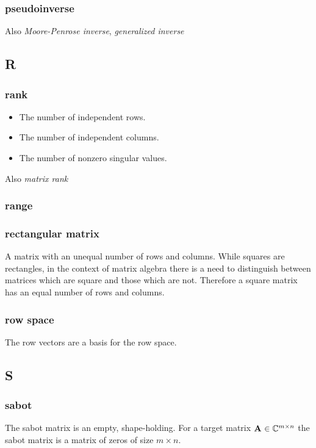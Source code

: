 \subsubsection*{pseudoinverse}
Also {\it Moore-Penrose inverse}, {\it generalized inverse}

\subsection*{R} 

\subsubsection*{rank}

\begin{itemize}
\item The number of independent rows.
\item The number of independent columns.
\item The number of nonzero singular values.
\end{itemize}
Also {\it matrix rank}
 
\subsubsection*{range}

\subsubsection*{rectangular matrix}
A matrix with an unequal number of rows and columns. While squares are rectangles, in the context of matrix algebra there is a need to distinguish between matrices which are square and those which are not. Therefore a square matrix has an equal number of rows and columns.

\subsubsection*{row space}
The row vectors are a basis for the row space.

\subsection*{S} 

\subsubsection*{sabot}
The sabot matrix is an empty, shape-holding. For a target matrix $\textbf{A}^{\mathrm{}}\in\mathbb{C}^{m \times n}$ the sabot matrix is a matrix of zeros of size $m \times n$.

